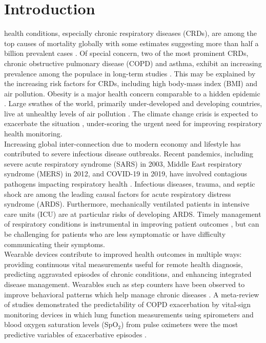\documentclass[journal]{IEEEtran}
\begin{document}
\section{Introduction}
 health conditions, especially chronic respiratory diseases (CRDs), are among the top causes of mortality globally with some estimates suggesting more than half a billion prevalent cases \cite{viegiGlobalBurdenChronic2020}. Of special concern, two of the most prominent CRDs, chronic obstructive pulmonary disease (COPD) and asthma, exhibit an increasing prevalence among the populace in long-term studies \cite{boersGlobalBurdenChronic2023}. This may be explained by the increasing risk factors for CRDs, including high body-mass index (BMI) and air pollution. Obesity is a major health concern comparable to a hidden epidemic \cite{boutari2022UpdateEpidemiology2022}. Large swathes of the world, primarily under-developed and developing countries, live at unhealthy levels of air pollution \cite{rentschlerGlobalAirPollution2023}. The climate change crisis is expected to exacerbate the situation \cite{andersenClimateChangeRespiratory2023}, under-scoring the urgent need for improving respiratory health monitoring. \\
Increasing global inter-connection due to modern economy and lifestyle has contributed to severe infectious disease outbreaks. Recent pandemics, including severe acute respiratory syndrome (SARS) in 2003, Middle East respiratory syndrome (MERS) in 2012, and COVID-19 in 2019, have involved contagious pathogens impacting respiratory health \cite{bakerInfectiousDiseaseEra2022}. Infectious diseases, trauma, and septic shock are among the leading causal factors for acute respiratory distress syndrome (ARDS). Furthermore, mechanically ventilated patients in intensive care units (ICU) are at particular risks of developing ARDS. Timely management of respiratory conditions is instrumental in improving patient outcomes \cite{leffCOPDClinicalSignificance2005} \cite{arriveEarlyIdentificationDiagnostic2021}, but can be challenging for patients who are less symptomatic or have difficulty communicating their symptoms. \\
Wearable devices contribute to improved health outcomes in multiple ways: providing continuous vital measurements useful for remote health diagnosis, predicting aggravated episodes of chronic conditions, and enhancing integrated disease management. Wearables such as step counters have been observed to improve behavioral patterns which help manage chronic diseases \cite{shahWearableTechnologyInterventions2023}. A meta-review of studies demonstrated the predictability of COPD exacerbation by vital-sign monitoring devices in which lung function measurements using spirometers and blood oxygen saturation levels (SpO$_2$) from pulse oximeters were the most predictive variables of exacerbative episodes \cite{alrajehMonitoringPhysiologicalParameters2016}. \\
\end{document}
